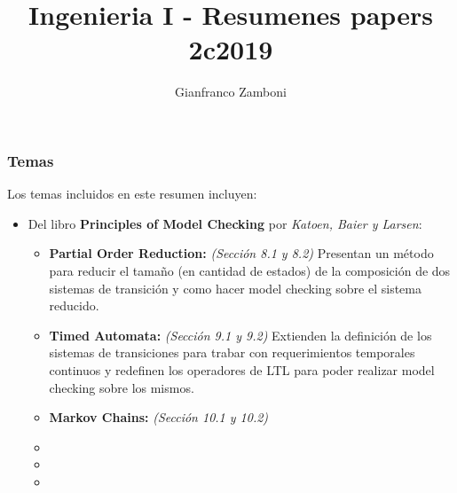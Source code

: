 




\title{Ingenieria I - Resumenes papers 2c2019}
\author{Gianfranco Zamboni}

	
\maketitle
\tableofcontents
\newpage
\part{}
\section{Temas}
Los temas incluidos en este resumen incluyen:
\begin{itemize}
	\item Del libro \textbf{Principles of Model Checking} por \textit{Katoen, Baier y Larsen}:
	\begin{itemize}
		\item \textbf{Partial Order Reduction:} \textit{(Sección 8.1 y 8.2)} Presentan un método para reducir el tamaño (en cantidad de estados) de la composición de dos  sistemas de transición y como hacer model checking sobre el sistema reducido.
		\item \textbf{Timed Automata:} \textit{(Sección 9.1 y 9.2)} Extienden la definición de los sistemas de transiciones para trabar con requerimientos temporales continuos y redefinen los operadores de LTL para poder realizar model checking sobre los mismos.
		\item \textbf{Markov Chains:} \textit{(Sección 10.1 y 10.2)} 
		\item {}
		\item {}
		\item {}
	\end{itemize}
\end{itemize}
\part{}
\part{}
\part{}
\part{}
\part{}
\part{}




